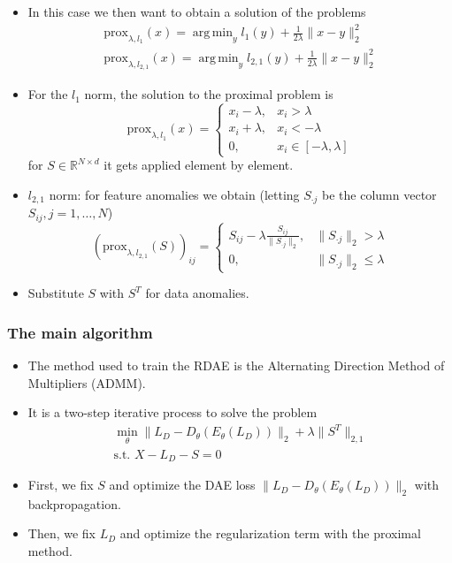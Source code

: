 \documentclass{beamer}
\theoremstyle{plain}
\theoremstyle{definition}
\theoremstyle{remark}
\newcommand{\R}{\mathbb{R}}
\newcommand{\norm}[1]{\lVert#1\rVert}
\newcommand{\prox}{\text{prox}}
\DeclareMathOperator*{\argmin}{arg\,min}
\begin{document}
\begin{frame}
	\begin{itemize}
		\item In this case we then want to obtain a solution of the problems
			\begin{align}
				\prox_{\lambda, l_1}(x) = \argmin_{y}{l_1(y)+\frac{1}{2\lambda}\norm{x-y}_{2}^{2}}\\
				\prox_{\lambda, l_{2,1}}(x) = \argmin_{y}{l_{2,1}(y)+\frac{1}{2\lambda}\norm{x-y}_{2}^{2}}
			\end{align} 
	\end{itemize}
\end{frame}

\begin{frame}
	\begin{itemize}
		\item For the $l_1$ norm, the solution to the proximal problem is
			\begin{equation}
				\prox_{\lambda, l_1}(x) = \begin{cases}
					x_i - \lambda, & x_i>\lambda\\
					x_i + \lambda, & x_i<-\lambda\\
					0, & x_i\in[-\lambda, \lambda]
				\end{cases}
			\end{equation}
			for $S\in\R^{N\times d}$  it gets applied element by element.
		\item $l_{2,1}$ norm: for feature anomalies we obtain (letting $S_{\cdot j}$ be the column vector $S_{ij}, j=1, \ldots, N$)
			\begin{equation}
				(\prox_{\lambda, l_{2,1}}(S))_{ij} = \begin{cases}
					S_{ij}- \lambda\frac{S_{ij}}{\norm{S_{\cdot j}}_{2}}, & \norm{S_{\cdot j}}_{2} > \lambda\\
					0, & \norm{S_{\cdot j}}_{2} \leq \lambda
				\end{cases}
			\end{equation}
		\item Substitute $S$ with $S^T$ for data anomalies.
	\end{itemize}
\end{frame}

\begin{frame}
	\frametitle{The main algorithm}
	\begin{itemize}
		\item The method used to train the RDAE is the Alternating Direction Method of Multipliers (ADMM).
		\item It is a two-step iterative process to solve the problem
			\begin{align}
				\min_{\theta}{\norm{L_D -D_{\theta}(E_{\theta}(L_D))}_2 + \lambda\norm{S^T}_{2,1}}\\
				\text{s.t. }X-L_D-S=0  
			\end{align}
		\item First, we fix $S$ and optimize the DAE loss $\norm{L_D -D_{\theta}(E_{\theta}(L_D))}_2$ with backpropagation.
		\item Then, we fix $L_D$ and optimize the regularization term with the proximal method.
	\end{itemize}
\end{frame}
\end{document}
